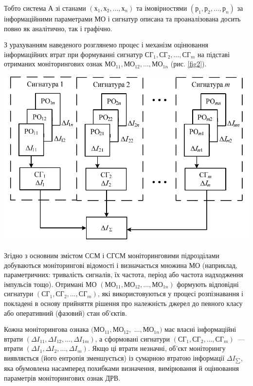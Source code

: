 Тобто система $А$ зі станами $(х_1, х_2, \ldots , х_n)$ та імовірностями 
$(р_1, р_2, \ldots, р_n)$ за інформаційними параметрами МО і сигнатур описана та проаналізована досить повно як аналітично, так і графічно.

З урахуванням наведеного розглянемо процес і механізм оцінювання інформаційних втрат при формуванні сигнатур $СГ_1, СГ_2, \ldots, СГ_m$ на підставі отриманих моніторингових ознак $МО_{11}, МО_{12}, \ldots, МО_{1n}$ (рис. \ref{fig2}).



%	
%	

\begin{Figure}%
	\includegraphics[width=\linewidth]{fig2}
		\label{fig2}
\end{Figure}

Згідно з основним змістом ССМ і СГСМ моніторинговими підрозділами добуваються моніторингові відомості і визначається множина МО (наприклад, параметричних: тривалість сигналів, їх частота, період або частота надходження імпульсів тощо). Отримані МО $(МО_{11}, МО_{12}, \ldots, МО_{1n})$ формують відповідні сигнатури $(СГ_1, СГ_2, \ldots, СГ_m)$, які використовуються у процесі розпізнавання і покладені в основу прийняття рішення про належність джерел до певного класу або оперативний (фазовий) стан об’єктів. 

Кожна моніторингова ознака $(МО_{11}, МО_{12},  $ $ \ldots, МО_{1n})$ має власні інформаційні втрати $(\Delta I_{11}, \Delta I_{12}, \ldots, \Delta I_{1m})$, а сформовані сигнатури $(СГ_1, СГ_2, \ldots, СГ_m)$~--- втрати $(\Delta I_{1}, \Delta I_{2}, \ldots, \Delta I_{m})$. Якщо ці втрати незначні, об’єкт моніторингу виявляється (його ентропія зменшується) із сумарною втратою інформації $\Delta I_{\sum}$, яка обумовлена насамперед похибками визначення, вимірювання й оцінювання параметрів моніторингових ознак ДРВ.

